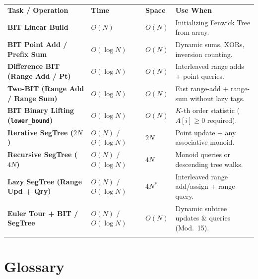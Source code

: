 \documentclass[11pt,a4paper]{article}
\theoremstyle{definition}
\begin{document}
\begingroup\small{}
\begin{tabularx}{\textwidth}{>{\raggedright\arraybackslash\bfseries}p{4.1cm} >{\centering\arraybackslash}p{2.3cm} >{\centering\arraybackslash}p{1.6cm} >{\raggedright\arraybackslash}X}
\arrayrulecolor{primaryblue}\toprule[1.2pt]
\rowcolor{primaryblue!10}
\textcolor{primaryblue}{\textbf{Task / Operation}} & \textcolor{primaryblue}{\textbf{Time}} & \textcolor{primaryblue}{\textbf{Space}} & \textcolor{primaryblue}{\textbf{Use When}} \\
\arrayrulecolor{codeframe}\midrule[0.6pt]
BIT Linear Build & $O(N)$ & $O(N)$ & Initializing Fenwick Tree from array. \\
BIT Point Add / Prefix Sum & $O(\log N)$ & $O(N)$ & Dynamic sums, XORs, inversion counting. \\
Difference BIT (Range Add / Pt) & $O(\log N)$ & $O(N)$ & Interleaved range adds + point queries. \\
Two-BIT (Range Add / Range Sum) & $O(\log N)$ & $O(N)$ & Fast range-add + range-sum without lazy tags. \\
BIT Binary Lifting (\texttt{lower\_bound}) & $O(\log N)$ & $O(N)$ & $K$-th order statistic ($A[i] \ge 0$ required). \\
Iterative SegTree ($2N$) & $O(N)$ / $O(\log N)$ & $2N$ & Point update + any associative monoid. \\
Recursive SegTree ($4N$) & $O(N)$ / $O(\log N)$ & $4N$ & Monoid queries or descending tree walks. \\
Lazy SegTree (Range Upd + Qry) & $O(N)$ / $O(\log N)$ & $4N^*$ & Interleaved range add/assign + range query. \\
Euler Tour + BIT / SegTree & $O(N)$ / $O(\log N)$ & $O(N)$ & Dynamic subtree updates \& queries (Mod.\ 15). \\
\arrayrulecolor{primaryblue}\bottomrule[1.2pt]
\end{tabularx}\endgroup
\par\smallskip{}

\section{Glossary}
\end{document}
